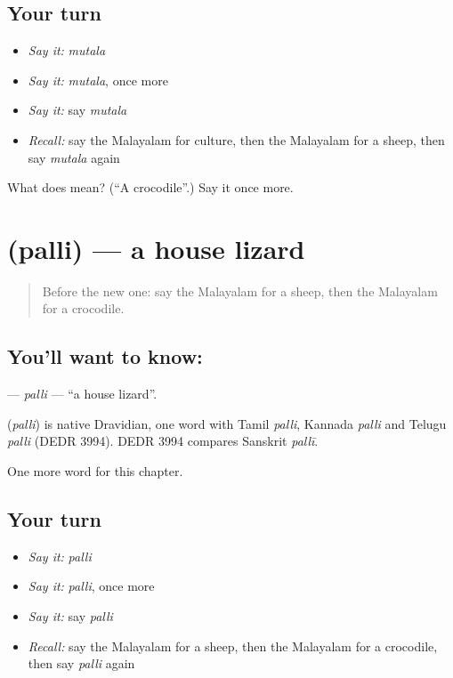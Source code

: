 \subsection*{Your turn}
\begin{itemize}
\raggedright
  \item \emph{Say it:} \emph{mutala}
  \item \emph{Say it:} \emph{mutala}, once more
  \item \emph{Say it:} say \emph{mutala}
  \item \emph{Recall:} say the Malayalam for culture, then the Malayalam for a sheep, then say \emph{mutala} again
\end{itemize}

\begin{tcolorbox}[breakable,colback=teal!4,colframe=teal!35!black,title={Before you move on}]
What does  mean? (\textquotedblleft{}A crocodile\textquotedblright{}.) Say it once more.
\end{tcolorbox}
\section[\texorpdfstring{\ml{പല്ലി} (palli)}{പല്ലി (palli)}]{ (palli) — a house lizard}

\label{lesson:ML-C327-palli}



\begin{quote}
Before the new one: say the Malayalam for a sheep, then the Malayalam for a crocodile.
\end{quote}

\subsection*{You'll want to know: }
\textbf{} — \emph{palli} — \textquotedblleft{}a house lizard\textquotedblright{}.

\begin{cousinweb}
\textbf{} (\emph{palli}) is native Dravidian, one word with Tamil \emph{palli}, Kannada \emph{palli} and Telugu \emph{palli} (DEDR 3994). DEDR 3994 compares Sanskrit \emph{pallī}.
\end{cousinweb}

\begin{grammarlens}[title={What you've built}]
One more word for this chapter.
\end{grammarlens}

\subsection*{Your turn}
\begin{itemize}
\raggedright
  \item \emph{Say it:} \emph{palli}
  \item \emph{Say it:} \emph{palli}, once more
  \item \emph{Say it:} say \emph{palli}
  \item \emph{Recall:} say the Malayalam for a sheep, then the Malayalam for a crocodile, then say \emph{palli} again
\end{itemize}

